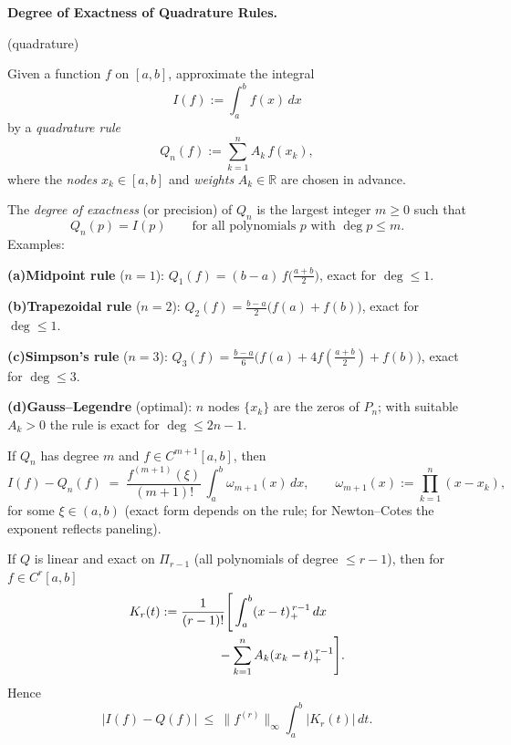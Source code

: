 \begin{problem}[CP-II-0353]
\label{prob:cp-ii-0353}
\textbf{Degree of Exactness of Quadrature Rules.}

\hspace*{1.5em}(quadrature)

Given a function $f$ on $[a,b]$, approximate the integral
\[
I(f):=\int_a^b f(x)\,dx
\]
by a \emph{quadrature rule}
\[
Q_n(f):=\sum_{k=1}^{n} A_k\, f(x_k),
\]
where the \emph{nodes} $x_k\in[a,b]$ and \emph{weights} $A_k\in\mathbb{R}$ are chosen in advance.

\bigskip

The \emph{degree of exactness} (or precision) of $Q_n$ is the largest integer $m\ge 0$ such that
\[
Q_n(p)=I(p)\qquad\text{for all polynomials $p$ with }\deg p\le m.
\]
Examples:
 \setlength{\itemsep}{0.6em}
	\par\smallskip\noindent\textbf{(a)}\quad \textbf{Midpoint rule} ($n=1$): $Q_1(f)=(b-a)\,f\!\big(\tfrac{a+b}{2}\big)$, exact for $\deg\le1$.
	\par\smallskip\noindent\textbf{(b)}\quad \textbf{Trapezoidal rule} ($n=2$): $Q_2(f)=\tfrac{b-a}{2}\big(f(a)+f(b)\big)$, exact for $\deg\le1$.
	\par\smallskip\noindent\textbf{(c)}\quad \textbf{Simpson's rule} ($n=3$): $Q_3(f)=\tfrac{b-a}{6}\big(f(a)+4f(\tfrac{a+b}{2})+f(b)\big)$, exact for $\deg\le3$.
	\par\smallskip\noindent\textbf{(d)}\quad \textbf{Gauss--Legendre} (optimal): $n$ nodes $\{x_k\}$ are the zeros of $P_n$; with suitable $A_k>0$ the rule is exact for $\deg\le 2n-1$.

\bigskip

If $Q_n$ has degree $m$ and $f\in C^{m+1}[a,b]$, then
\[
I(f)-Q_n(f) \;=\; \frac{f^{(m+1)}(\xi)}{(m+1)!}\,\int_a^b \omega_{m+1}(x)\,dx,
\qquad
\omega_{m+1}(x):=\prod_{k=1}^n (x-x_k),
\]
for some $\xi\in(a,b)$ (exact form depends on the rule; for Newton--Cotes the exponent reflects paneling).

If $Q$ is linear and exact on $\Pi_{r-1}$ (all polynomials of degree $\le r-1$), then for $f\in C^r[a,b]$
\[
\begin{aligned}
K_r(t)
&:= \frac{1}{(r-1)!}
   \Bigg[
      \int_a^b (x-t)_{+}^{\,r-1}\,dx \\
&\hspace{4.5em}
      - \sum_{k=1}^{n}
        A_k (x_k-t)_{+}^{\,r-1}
   \Bigg].
\end{aligned}
\]
Hence
\[
|I(f)-Q(f)|\ \le\ \|f^{(r)}\|_\infty \int_a^b |K_r(t)|\,dt.
\]


\end{problem}
